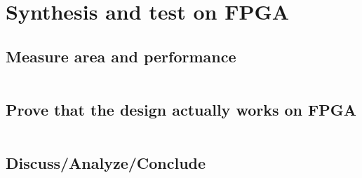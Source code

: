 \section{Synthesis and test on FPGA}
\subsection{Measure area and performance}
\inputminted[linenos=0, firstline=309, lastline=318, frame=none]{text}{../RSA/synthesis_report.txt}
%
\subsection{Prove that the design actually works on FPGA}
\inputminted[linenos=0]{text}{../rocket.txt}
%
\subsection{Discuss/Analyze/Conclude}